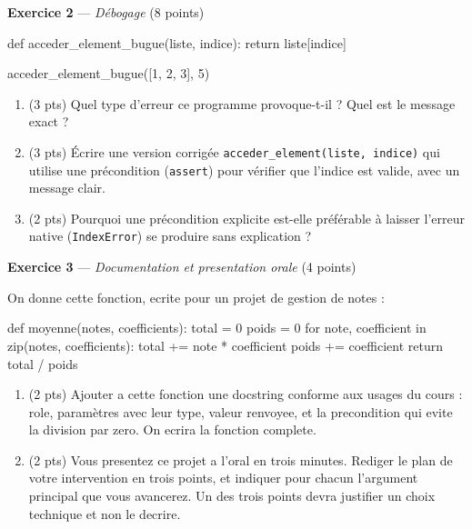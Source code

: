 \bigskip

\textbf{Exercice 2} --- \textit{Débogage} \hfill (8 points)

\begin{python}
def acceder_element_bugue(liste, indice):
    return liste[indice]

acceder_element_bugue([1, 2, 3], 5)
\end{python}

\begin{enumerate}
  \item (3 pts) Quel type d'erreur ce programme provoque-t-il ? Quel est le message exact ?
  \item (3 pts) Écrire une version corrigée \lstinline{acceder_element(liste, indice)} qui utilise une précondition (\lstinline{assert}) pour vérifier que l'indice est valide, avec un message clair.
  \item (2 pts) Pourquoi une précondition explicite est-elle préférable à laisser l'erreur native (\lstinline{IndexError}) se produire sans explication ?
\end{enumerate}


\bigskip

\textbf{Exercice 3} --- \textit{Documentation et presentation orale} \hfill (4 points)

On donne cette fonction, ecrite pour un projet de gestion de notes :

\begin{python}
def moyenne(notes, coefficients):
    total = 0
    poids = 0
    for note, coefficient in zip(notes, coefficients):
        total += note * coefficient
        poids += coefficient
    return total / poids
\end{python}

\begin{enumerate}
  \item (2 pts) Ajouter a cette fonction une docstring conforme aux usages du cours : role,
  paramètres avec leur type, valeur renvoyee, et la precondition qui evite la division par
  zero. On ecrira la fonction complete.
  \item (2 pts) Vous presentez ce projet a l'oral en trois minutes. Rediger le plan de votre
  intervention en trois points, et indiquer pour chacun l'argument principal que vous
  avancerez. Un des trois points devra justifier un choix technique et non le decrire.
\end{enumerate}

